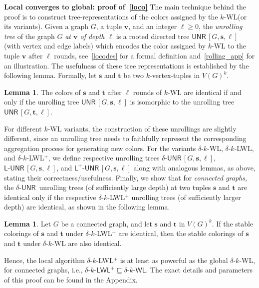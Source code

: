 \documentclass{article}
\newcommand{\xhdr}[1]{{\noindent\bfseries #1}}
\theoremstyle{definition}
\newtheorem{lemma}[theorem]{Lemma}
\newcommand{\new}[1]{\emph{#1}}
\renewcommand{\vec}[1]{\mathbf{#1}}
\newcommand{\kwl}{$k$-\textsf{WL}\xspace}
\newcommand{\deltakwl}{$\delta$-$k$-\textsf{WL}\xspace}
\newcommand{\deltakwlm}{\delta\textrm{-}k\textrm{-}\textsf{WL}\xspace}
\newcommand{\localkwl}{$\delta$-$k$-\textsf{LWL}\xspace}
\newcommand{\pluskwl}{$\delta$-$k$-\textsf{LWL}$^+$\xspace}
\newcommand{\pluskwlm}{\delta\textrm{-}k\textrm{-}\textsf{LWL}^+\xspace}
\newcommand{\UNR}{\textsf{UNR}\,}
\newcommand{\deltaunr}{\delta\text{-}\UNR\xspace}
\newcommand{\localunr}{\textsf{L}\text{-}\UNR\xspace}
\newcommand{\plusunr}{\textsf{L}^{\!+}\text{-}\UNR\xspace}
\begin{document}
\xhdr{Local converges to global: proof of~\cref{loco}} The main technique behind the proof is to construct tree-representations of the colors assigned by the \kwl (or its variants). Given a graph $G$, a tuple $\vec{v}$, and an integer $\ell \geq 0$, the \emph{unrolling tree} of the graph $G$ \new{at $\vec{v}$ of depth $\ell$} is a rooted directed tree $\UNR[G,\vec{s},\ell]$ (with vertex and edge labels) which encodes the color assigned by \kwl to the tuple $\vec{v}$ after $\ell$ rounds, see~\cref{locodes} for a formal definition and~\cref{rolling_app} for an illustration. The usefulness of these tree representations is established by the following lemma. Formally, let $\vec{s}$ and $\vec{t}$ be two $k$-vertex-tuples in $V(G)^k$.
\begin{lemma}\label{encwl}
	The colors of $\vec{s}$ and $\vec{t}$ after $\ell$ rounds of \kwl are identical if and only if the unrolling tree $\UNR[G,\vec{s},\ell]$ is isomorphic to the unrolling tree $\UNR[G,\vec{t},\ell]$.  
\end{lemma}
For different \kwl variants, the construction of these unrollings are slightly different, since an unrolling tree needs to faithfully represent the corresponding aggregation process for generating new colors. For the variants \deltakwl, \localkwl, and \pluskwl, we define respective unrolling trees $\deltaunr[G,\vec{s},\ell]$, $\localunr[G,\vec{s},\ell]$, and $\plusunr[G,\vec{s},\ell]$ along with analogous lemmas, as above, stating their correctness/usefulness. Finally, we show that for \emph{connected graphs}, the $\deltaunr$ unrolling trees (of sufficiently large depth) at two tuples $\vec{s}$ and $\vec{t}$ are identical only if the respective \pluskwl unrolling trees (of sufficiently larger depth) are identical, as shown in the following lemma. 
\begin{lemma}\label{pluseqtodelta}
	Let $G$ be a connected graph, and let $\vec{s}$ and $\vec{t}$ in $V(G)^k$. If the stable colorings of $\vec{s}$ and $\vec{t}$ under \pluskwl are identical, 
	then the stable colorings of $\vec{s}$ and $\vec{t}$ under \deltakwl are also identical. 
\end{lemma}
Hence, the local algorithm \pluskwl is at least as powerful as the global \deltakwl, for connected graphs, i.e., $\pluskwlm \sqsubseteq \deltakwlm$. 
The exact details and parameters of this proof can be found in the Appendix.
\end{document}

